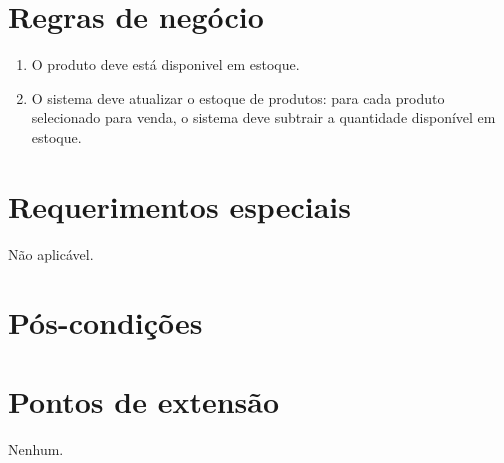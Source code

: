\section{Regras de negócio}
\begin{enumerate}
	\item O produto deve está disponivel em estoque. \label{rn:1}
	\item O sistema deve atualizar o estoque de produtos: para cada produto selecionado para venda, o sistema deve subtrair a quantidade disponível em estoque. \label{rn:2}
\end{enumerate}

\section{Requerimentos especiais}

Não aplicável.

\section{Pós-condições}

\section{Pontos de extensão}

Nenhum.